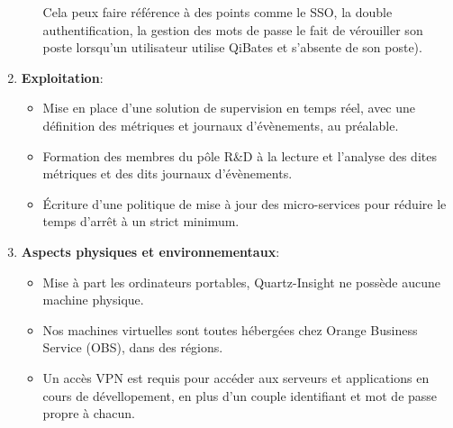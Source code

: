 \documentclass[a4paper, 11pt]{report}
\begin{document}
\begin{enumerate}
\begin{itemize}
          Cela peux faire référence à des points comme le SSO, la double authentification, la gestion des mots de passe le fait de vérouiller son poste lorsqu'un utilisateur utilise QiBates et s'absente de son poste).
      \end{itemize}
    \item \textbf{Exploitation}:
      \begin{itemize}
        \item Mise en place d'une solution de supervision en temps réel, avec une définition des métriques et journaux d’évènements, au préalable.
        \item Formation des membres du pôle R&D à la lecture et l'analyse des dites métriques et des dits journaux d’évènements.
        \item Écriture d'une politique de mise à jour des micro-services pour réduire le temps d'arrêt à un strict minimum.
      \end{itemize}
    \item \textbf{Aspects physiques et environnementaux}:
      \begin{itemize}
        \item Mise à part les ordinateurs portables, Quartz-Insight ne possède aucune machine physique.
        \item Nos machines virtuelles sont toutes hébergées chez Orange Business Service (OBS), dans des régions.
        \item Un accès VPN est requis pour accéder aux serveurs et applications en cours de dévellopement, en plus d'un couple identifiant et mot de passe propre à chacun.
      \end{itemize}
  \end{enumerate}
\end{document}
